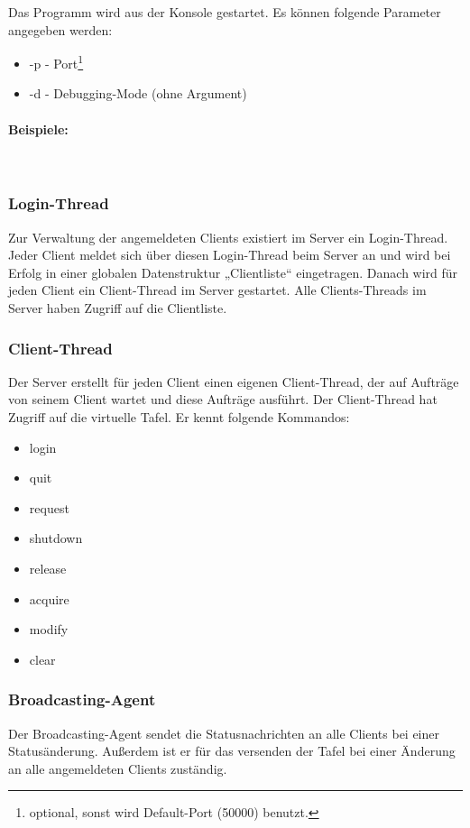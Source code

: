 Das Programm wird aus der Konsole gestartet. Es können folgende Parameter angegeben werden:
\begin{itemize}
 \item -p - Port\footnote{optional, sonst wird Default-Port (50000) benutzt.}
 \item -d - Debugging-Mode (ohne Argument)
\end{itemize}

\paragraph*{Beispiele: \\}
 \\

\subsubsection{Login-Thread}
Zur Verwaltung der angemeldeten Clients existiert im Server ein Login-Thread. Jeder Client meldet sich über 
diesen Login-Thread beim Server an und wird bei Erfolg in einer globalen Datenstruktur „Clientliste“ eingetragen. 
Danach wird für jeden Client ein Client-Thread im Server gestartet. Alle Clients-Threads im Server haben Zugriff 
auf die Clientliste.

\subsubsection{Client-Thread}
Der Server erstellt für jeden Client einen eigenen Client-Thread, der auf Aufträge von seinem Client wartet und 
diese Aufträge ausführt. Der Client-Thread hat Zugriff auf die virtuelle Tafel. Er kennt folgende Kommandos:
\begin{itemize}
 \item login
 \item quit
 \item request
 \item shutdown
 \item release
 \item acquire
 \item modify
 \item clear
\end{itemize}

\subsubsection{Broadcasting-Agent}
Der Broadcasting-Agent sendet die Statusnachrichten an alle Clients bei einer Statusänderung. Außerdem ist er für
das versenden der Tafel bei einer Änderung an alle angemeldeten Clients zuständig.

